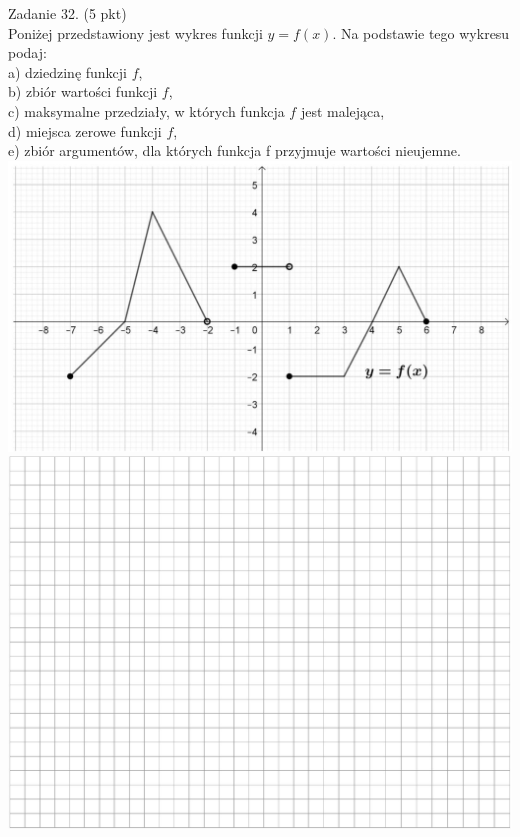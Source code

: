\documentclass[10pt]{article}
\begin{document}
Zadanie 32. (5 pkt)\\
Poniżej przedstawiony jest wykres funkcji \(y=f(x)\). Na podstawie tego wykresu podaj:\\
a) dziedzinę funkcji \(f\),\\
b) zbiór wartości funkcji \(f\),\\
c) maksymalne przedziały, w których funkcja \(f\) jest malejąca,\\
d) miejsca zerowe funkcji \(f\),\\
e) zbiór argumentów, dla których funkcja f przyjmuje wartości nieujemne.\\
\includegraphics[max width=\textwidth, center]{2024_11_21_0fa17f80dfe1c6bd3b66g-11(1)}\\
\includegraphics[max width=\textwidth, center]{2024_11_21_0fa17f80dfe1c6bd3b66g-11}
\end{document}

